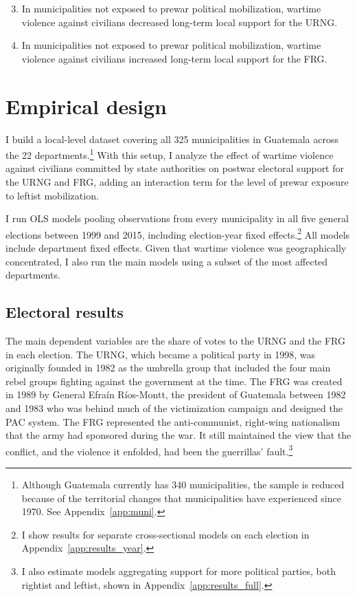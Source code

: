 \documentclass[12pt, notitlepage]{article}
\begin{document}
\begin{enumerate}[label={\bf H\arabic*:} , ref=H\arabic* , wide=0.5em, leftmargin=*]
  \setcounter{enumi}{2}
  \item \label{h:URNG-no-mob} In municipalities not exposed to prewar political mobilization, wartime violence against civilians decreased long-term local support for the URNG.
  \item \label{h:FRG-no-mob} In municipalities not exposed to prewar political mobilization, wartime violence against civilians increased long-term local support for the FRG.
\end{enumerate}

\section*{Empirical design}

I build a local-level dataset covering all 325 municipalities in Guatemala across the 22 departments.\footnote{Although Guatemala currently has 340 municipalities, the sample is reduced because of the territorial changes that municipalities have experienced since 1970. See Appendix~\ref{app:muni}.}
With this setup, I analyze the effect of wartime violence against civilians committed by state authorities on postwar electoral support for the URNG and FRG, adding an interaction term for the level of prewar exposure to leftist mobilization.

I run OLS models pooling observations from every municipality in all five general elections between 1999 and 2015, including election-year fixed effects.\footnote{I show results for separate cross-sectional models on each election in Appendix~\ref{app:results_year}.}
All models include department fixed effects.
Given that wartime violence was geographically concentrated, I also run the main models using a subset of the most affected departments.

\subsection*{Electoral results}

The main dependent variables are the share of votes to the URNG and the FRG in each election.
The URNG, which became a political party in 1998, was originally founded in 1982 as the umbrella group that included the four main rebel groups fighting against the government at the time.
The FRG was created in 1989 by General Efraín Ríos-Montt, the president of Guatemala between 1982 and 1983 who was behind much of the victimization campaign and designed the PAC system.
The FRG represented the anti-communist, right-wing nationalism that the army had sponsored during the war.
It still maintained the view that the conflict, and the violence it enfolded, had been the guerrillas' fault.\footnote{I also estimate models aggregating support for more political parties, both rightist and leftist, shown in Appendix~\ref{app:results_full}.}
\end{document}
